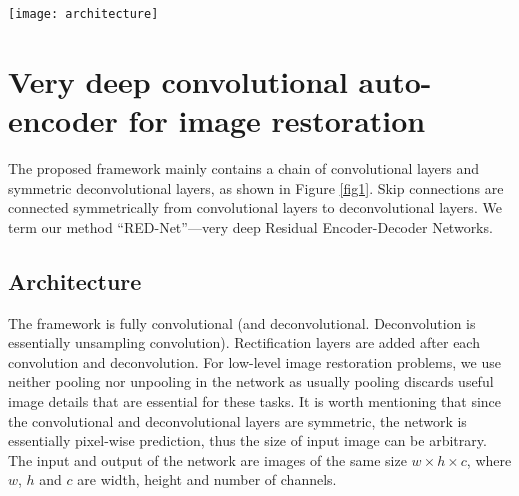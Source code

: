 \begin{figure*}
\centering
\texttt{[image: architecture]}
\caption{The overall architecture of our proposed network. The network
contains layers of symmetric convolution (encoder) and deconvolution (decoder).
Skip shortcuts are connected every a few (in our experiments, two) layers from
convolutional feature maps to their mirrored deconvolutional feature maps.
The response from a convolutional layer is directly propagated to the corresponding
mirrored deconvolutional layer, both forwardly and backwardly.}
\label{fig1}
\end{figure*}

\section{Very deep convolutional auto-encoder for image restoration}
\label{sec:main}

The proposed framework mainly contains a chain of convolutional layers and symmetric
deconvolutional layers, as shown in Figure \ref{fig1}. Skip connections are connected
symmetrically from convolutional layers to deconvolutional layers. We term our method
``RED-Net''---very deep Residual Encoder-Decoder Networks.


\subsection{Architecture}

The framework is fully convolutional (and deconvolutional.  Deconvolution is essentially unsampling convolution). Rectification layers are added
after each convolution and deconvolution. For low-level image restoration problems, we
use neither pooling nor unpooling in the network as usually pooling discards useful image
details that are essential for these tasks. It is worth mentioning that since the convolutional
and deconvolutional layers are symmetric, the network is essentially pixel-wise prediction,
thus the size of input image can be arbitrary. The input and output of the network are images
of the same size $w\times h\times c$, where $w$, $h$ and $c$ are width, height and number of channels.

